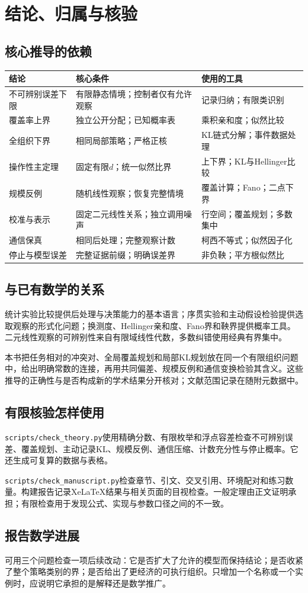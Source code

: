 \chapter{结论、归属与核验}
\label{app:verification}

\section{核心推导的依赖}
\begin{longtable}{p{}p{}p{}}
\toprule
结论 & 核心条件 & 使用的工具\\\midrule
不可辨别误差下限 & 有限静态情境；控制者仅有允许观察 & 记录归纳；有限类识别\\
覆盖率上界 & 独立公开分配；已知概率表 & 乘积亲和度；似然比较\\
全组织下界 & 相同局部策略；严格正核 & KL链式分解；事件数据处理\\
操作性主定理 & 固定有限$d$；统一似然比界 & 上下界；KL与Hellinger比较\\
规模反例 & 随机线性观察；恢复完整情境 & 覆盖计算；Fano；二点下界\\
校准与表示 & 固定二元线性关系；独立调用噪声 & 行空间；覆盖规划；多数集中\\
通信保真 & 相同后处理；完整观察计数 & 柯西不等式；似然因子化\\
停止与模型误差 & 完整证据前缀；明确误差界 & 非负鞅；平方根似然比\\
\bottomrule
\end{longtable}

\section{与已有数学的关系}
统计实验比较提供后处理与决策能力的基本语言；序贯实验和主动假设检验提供选取观察的形式化问题；换测度、Hellinger亲和度、Fano界和鞅界提供概率工具。二元线性观察的可辨别性来自有限域线性代数，多数纠错使用经典有界集中。

本书把任务相对的冲突对、全局覆盖规划和局部KL规划放在同一个有限组织问题中，给出明确常数的连接，再用共同偏差、规模反例和通信变换检验其含义。这些推导的正确性与是否构成新的学术结果分开核对；文献范围记录在随附元数据中。

\section{有限核验怎样使用}
\nolinkurl{scripts/check_theory.py}使用精确分数、有限枚举和浮点容差检查不可辨别误差、覆盖规划、主动记录KL、规模反例、通信压缩、计数充分性与停止概率。它还生成可复算的数据与表格。

\nolinkurl{scripts/check_manuscript.py}检查章节、引文、交叉引用、环境配对和练习数量。构建报告记录XeLaTeX结果与相关页面的目视检查。一般定理由正文证明承担；有限检查用于发现公式、实现与参数口径之间的不一致。

\section{报告数学进展}
可用三个问题检查一项后续改动：它是否扩大了允许的模型而保持结论；是否收紧了整个策略类别的界；是否给出了更经济的可执行组织。只增加一个名称或一个实例时，应说明它承担的是解释还是数学推广。
